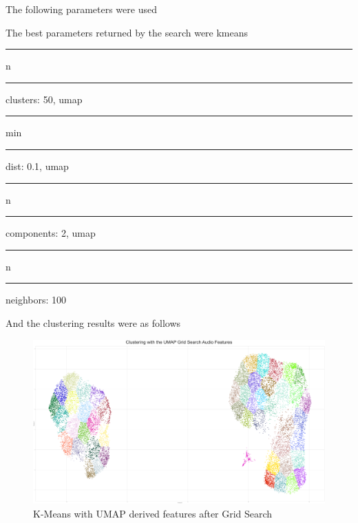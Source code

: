 \begin{appendix}
\newlength\dunder
\settowidth{\dunder}{\_}
The following parameters were used
\begin{table}
\begin{center}
\end{center}
\caption{Grid Search parameters for UMAP with K-Means}
\end{table}

The best parameters returned by the search were kmeans\rule{2\dunder}{0.02pt}n\rule{1\dunder}{0.1pt}clusters: 50, umap\rule{2\dunder}{0.02pt}min\rule{1\dunder}{0.1pt}dist: 0.1, umap\rule{2\dunder}{0.02pt}n\rule{1\dunder}{0.1pt}components: 2, umap\rule{2\dunder}{0.02pt}n\rule{1\dunder}{0.1pt}neighbors: 100

And the clustering results were as follows
\begin{figure}[h]
    \centering
    \includegraphics[scale=0.07]{Outputs/Cluestering - UMAP Grid Search Features.png}
    \caption{K-Means with UMAP derived features after Grid Search}
    \captionsetup{justification=centering,margin=1cm}
    \label{fig:kmeans-umap-gs}
\end{figure}


\end{appendix}
